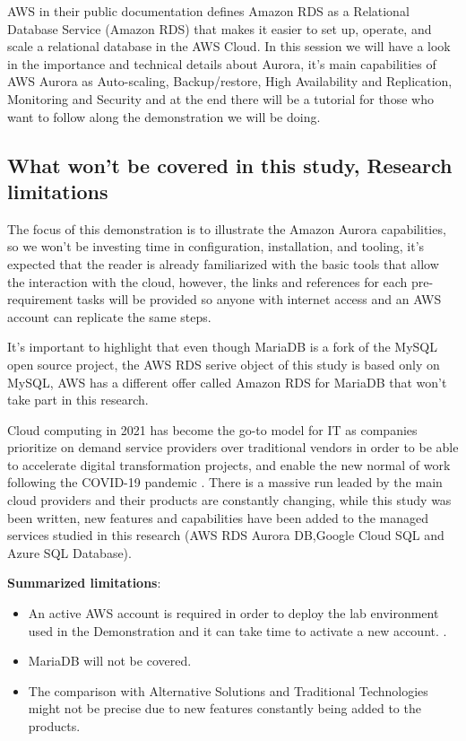 \documentclass{article}
\begin{document}
AWS in their public documentation defines Amazon RDS as a Relational Database Service (Amazon RDS) that makes it easier to set up, operate, and scale a relational database in the AWS Cloud. In this session we will have a look in the importance and technical details about Aurora, it's main capabilities of AWS Aurora as Auto-scaling, Backup/restore, High Availability and Replication, Monitoring and Security and at the end there will be a tutorial for those who want to follow along the demonstration we will be doing. 

\subsection{What won't be covered in this study, Research limitations}

The focus of this demonstration is to illustrate the Amazon Aurora capabilities, so we won’t be investing time in configuration, installation, and tooling, it’s expected that the reader is already familiarized with the basic tools that allow the interaction with the cloud, however, the links and references for each pre-requirement tasks will be provided so anyone with internet access and an AWS account can replicate the same steps.

It's important to highlight that even though MariaDB is a fork of the MySQL open source project, the AWS RDS serive object of this study is based only on MySQL, AWS has a different offer called Amazon RDS for MariaDB that won't take part in this research. 

Cloud computing in 2021 has become the go-to model for IT as companies prioritize on demand service providers over traditional vendors in order to be able to accelerate digital transformation projects, and enable the new normal of work following the COVID-19 pandemic \cite{dignan2021}. There is a massive run leaded by the main cloud providers and their products are constantly changing, while this study was been written, new features and capabilities have been added to the managed services studied in this research (AWS RDS Aurora DB,Google Cloud SQL and Azure SQL Database).
\bigskip

\textbf{Summarized limitations}:
\begin{itemize}
    \item An active AWS account is required in order to deploy the lab environment used in the Demonstration and it can take time to activate a new account. \cite{createaccount}. 
    \item MariaDB will not be covered. 
    \item The comparison with Alternative Solutions and Traditional Technologies might not be precise due to new features constantly being added to the products.\cite{rdsvsazure2019}
\end{itemize}
\end{document}
